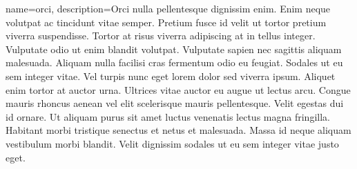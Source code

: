 
{
  name={orci},
  description={Orci nulla pellentesque dignissim enim. Enim neque volutpat ac tincidunt vitae semper. Pretium fusce id velit ut tortor pretium viverra suspendisse. Tortor at risus viverra adipiscing at in tellus integer. Vulputate odio ut enim blandit volutpat. Vulputate sapien nec sagittis aliquam malesuada. Aliquam nulla facilisi cras fermentum odio eu feugiat. Sodales ut eu sem integer vitae. Vel turpis nunc eget lorem dolor sed viverra ipsum. Aliquet enim tortor at auctor urna. Ultrices vitae auctor eu augue ut lectus arcu. Congue mauris rhoncus aenean vel elit scelerisque mauris pellentesque. Velit egestas dui id ornare. Ut aliquam purus sit amet luctus venenatis lectus magna fringilla. Habitant morbi tristique senectus et netus et malesuada. Massa id neque aliquam vestibulum morbi blandit. Velit dignissim sodales ut eu sem integer vitae justo eget.}
}



\glsaddall
